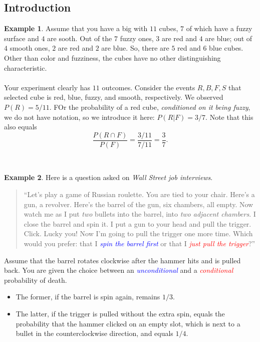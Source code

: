 \documentclass[12pt,a4paper]{article}
\theoremstyle{definition}
\newtheorem{example}{Example}[section]
\theoremstyle{definition}
\theoremstyle{definition}
\theoremstyle{definition}
\theoremstyle{remark}
\theoremstyle{definition}
\begin{document}
\subsection{Introduction}
\begin{example}
	Assume that you have a big with $11$ cubes, $7$ of which have a fuzzy surface and $4$ are sooth. Out of the $7$ fuzzy ones, $3$ are red and $4$ are blue; out of $4$ smooth ones, $2$ are red and $2$ are blue. So, there are $5$ red and $6$ blue cubes. Other than color and fuzziness, the cubes have no other distinguishing characteristic.\\
	\\
	Your experiment clearly has $11$ outcomes. Consider the events $R, B, F, S$ that selected cube is red, blue, fuzzy, and smooth, respectively. We observed $P(R)=5/11$. FOr the probability of a red cube, \textit{conditioned on it being fuzzy}, we do not have notation, so we introduce it here: $P(R|F)=3/7$. Note that this also equals \[
	\frac{P(R\cap F)}{P(F)}=\frac{3/11}{7/11}=\frac{3}{7}.
	\]
\end{example}
\
\begin{example}
	Here is a question asked on \textit{Wall Street job interviews}.\begin{quote}
		``Let's play a game of Russian roulette. You are tied to your chair. Here's a gun, a revolver. Here's the barrel of the gun, six chambers, all empty. Now watch me as I put \textit{two} bullets into the barrel, into \textit{two adjacent chambers}. I close the barrel and spin it. I put a gun to your head and pull the trigger. Click. Lucky you! Now I'm going to pull the trigger one more time. Which would you prefer: that I \textcolor{blue}{\it spin the barrel first} or that I \textcolor{red}{\it just pull the trigger}?''
	\end{quote} Assume that the barrel rotates clockwise after the hammer hits and is pulled back. You are given the choice between an \textcolor{blue}{\it unconditional} and a \textcolor{red}{\it conditional} probability of death. \begin{itemize}
	\item The former, if the barrel is spin again, remains $1/3$.
	\item The latter, if the trigger is pulled without the extra spin, equals the probability that the hammer clicked on an empty slot, which is next to a bullet in the counterclockwise direction, and equals $1/4$.
\end{itemize}
\end{example}
\end{document}
